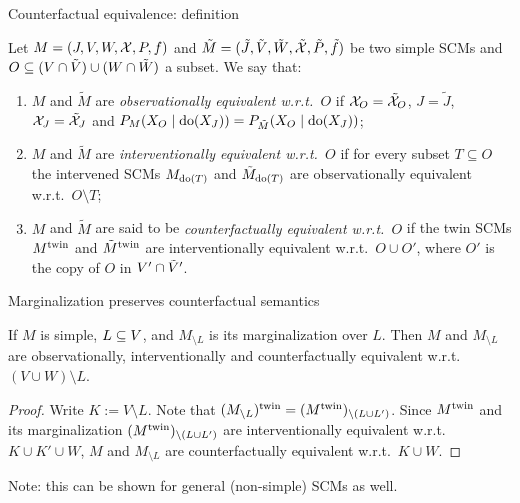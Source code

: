 \begin{frame}{Counterfactual equivalence: definition}
\begin{definition}
  Let $M = \left ( J, V, W, \mathcal{X}, P, f \right )$ and
  $\tilde{M} = ( \tilde{J}, \tilde{V}, \tilde{W}, \tilde{\mathcal{X}}, \tilde{P}, \tilde{f} )$ be two simple SCMs
  and $O \subseteq (V \cap \tilde{V}) \cup (W \cap \tilde{W})$ a subset.
  We say that:
  \begin{enumerate}
    \item {\color{gray}$M$ and $\tilde{M}$ are \emph{observationally equivalent w.r.t.\ $O$} if $\mathcal{X}_O = \tilde{\mathcal{X}}_O$, $J = \tilde{J}$, $\mathcal{X}_J = \tilde{\mathcal{X}}_J$ and $P_{M}(X_O \mid \operatorname{do}(X_{J})) = P_{\tilde{M}}(X_O \mid \operatorname{do}(X_{J}))$;}
    \item {\color{gray}$M$ and $\tilde{M}$ are \emph{interventionally equivalent w.r.t.\ $O$} if for every subset $T \subseteq O$ the intervened SCMs $M_{\operatorname{do}(T)}$ and $\tilde{M}_{\operatorname{do}(T)}$ are observationally equivalent w.r.t.\ $O \setminus T$;}
    \item $M$ and $\tilde{M}$ are said to be \emph{counterfactually equivalent w.r.t.\ $O$} if the twin SCMs $M^{\mathrm{twin}}$ and $\tilde{M}^{\mathrm{twin}}$ are interventionally equivalent w.r.t.\ $O \cup O'$, where
  $O'$ is the copy of $O$ in $V' \cap \tilde{V}'$.
  \end{enumerate}
\end{definition}
\end{frame}

\begin{frame}{Marginalization preserves counterfactual semantics}
\begin{Thm}
  If $M$ is simple, $L \subseteq V$, and
  $M_{\setminus L}$ is its marginalization over $L$. Then $M$ and $M_{\setminus L}$ are {\color{gray}observationally,
  interventionally} and counterfactually equivalent w.r.t.\ $(V \cup W) \setminus L$.
\end{Thm}
\begin{proof}
  Write $K := V \setminus L$.
  Note that $(M_{\setminus L})^{\mathrm{twin}} = (M^{\mathrm{twin}})_{\setminus (L \cup L')}$. 
  Since $M^{\mathrm{twin}}$ and its marginalization
  $(M^{\mathrm{twin}})_{\setminus (L \cup L')}$ are interventionally equivalent w.r.t.\ $K \cup K' \cup W$,
  $M$ and $M_{\setminus L}$ are counterfactually equivalent w.r.t.\ $K \cup W$.
\end{proof}
Note: this can be shown for general (non-simple) SCMs as well.
\end{frame}

